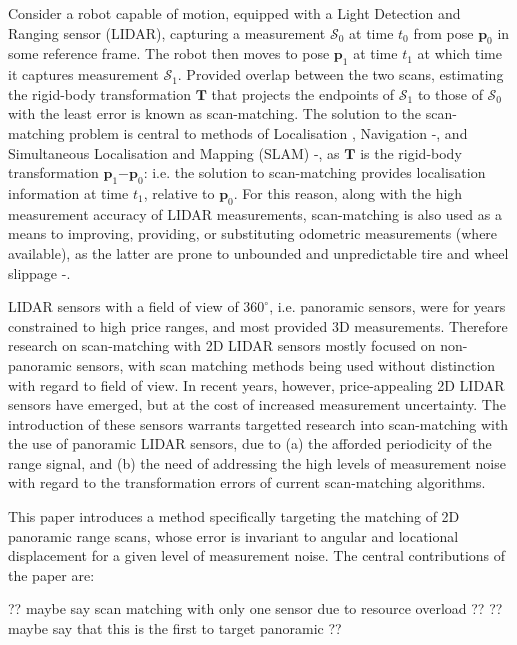 Consider a robot capable of motion, equipped with a Light Detection and Ranging
sensor (LIDAR), capturing a measurement $\mathcal{S}_0$ at time $t_0$ from pose
$\bm{p}_0$ in some reference frame. The robot then moves to pose $\bm{p}_1$ at
time $t_1$ at which time it captures measurement $\mathcal{S}_1$. Provided
overlap between the two scans, estimating the rigid-body transformation
$\bm{T}$ that projects the endpoints of $\mathcal{S}_1$ to those of
$\mathcal{S}_0$ with the least error is known as scan-matching. The solution to
the scan-matching problem is central to methods of Localisation
\cite{lidar_localisation_1}\cite{lidar_localisation_2}, Navigation
\cite{lidar_navigation_1}-\cite{lidar_navigation_4}, and Simultaneous
Localisation and Mapping (SLAM) \cite{lidar_slam_1}-\cite{lidar_slam_5}, as
$\bm{T}$ is the rigid-body transformation $\bm{p}_1$$-$$\bm{p}_0$: i.e. the
solution to scan-matching provides localisation information at time $t_1$,
relative to $\bm{p}_0$. For this reason, along with the high measurement
accuracy of LIDAR measurements, scan-matching is also used as a means to
improving, providing, or substituting odometric measurements (where available),
as the latter are prone to unbounded and unpredictable tire and wheel
slippage \cite{olson}-\cite{lidar_odom_3}.

LIDAR sensors with a field of view of $360^\circ$, i.e. panoramic sensors, were
for years constrained to high price ranges, and most provided 3D measurements.
Therefore research on scan-matching with 2D LIDAR sensors mostly focused on
non-panoramic sensors, with scan matching methods being used without distinction
with regard to field of view. In recent years, however, price-appealing
2D LIDAR sensors have emerged, but at the cost of increased measurement
uncertainty. The introduction of these sensors warrants targetted research
into scan-matching with the use of panoramic LIDAR sensors, due to (a) the
afforded periodicity of the range signal, and (b) the need of
addressing the high levels of measurement noise with regard to the
transformation errors of current scan-matching algorithms.

This paper introduces a method specifically targeting the matching of 2D
panoramic range scans, whose error is invariant to angular and
locational displacement for a given level of measurement noise.
The central contributions of the paper are:

?? maybe say scan matching with only one sensor due to resource overload ??
?? maybe say that this is the first to target panoramic ??

